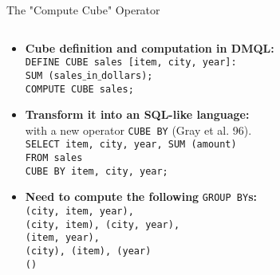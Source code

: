 \begin{frame}{The "Compute Cube" Operator}
	\begin{columns}
		\begin{column}{0.6\textwidth}
			\vspace{-4.8cm}
			\begin{itemize}
				\item \textbf{Cube definition and computation in DMQL:} \\
				      \texttt{DEFINE CUBE sales [item, city, year]:}\\
				      \texttt{SUM (sales$\_$in$\_$dollars);}\\
				      \texttt{COMPUTE CUBE sales;}
				\item \textbf{Transform it into an SQL-like language:}\\
				      with a new operator \texttt{CUBE BY} (Gray et al. 96).\\
				      \texttt{SELECT item, city, year, SUM (amount)}\\
				      \texttt{FROM sales}\\
				      \texttt{CUBE BY item, city, year;}
				\item \textbf{Need to compute the following} \texttt{GROUP BY}\textbf{s:}\\
				      \texttt{(city, item, year),}\\
				      \texttt{(city, item), (city, year),}\\
				      \texttt{(item, year),}\\
				      \texttt{(city), (item), (year)}\\
				      \texttt{()}
			\end{itemize}
		\end{column}
		\begin{column}{0.3\textwidth}  %
		\end{column}
	\end{columns}
\end{frame}

